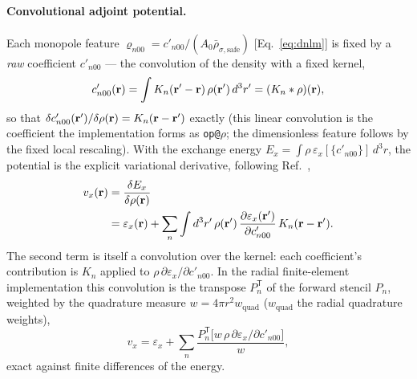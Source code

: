 \paragraph*{Convolutional adjoint potential.}
Each monopole feature $\varrho_{n00}=c'_{n00}/(A_0\bar\rho_{\sigma,\mathrm{safe}})$
[Eq.~\eqref{eq:dnlm}] is fixed by a \emph{raw} coefficient $c'_{n00}$ --- the convolution of the
density with a fixed kernel,
\begin{equation}
\label{eq:descriptor-conv}
c'_{n00}(\mathbf{r})=\int K_n(\mathbf{r}'-\mathbf{r})\,\rho(\mathbf{r}')\,d^3r'=(K_n*\rho)(\mathbf{r}),
\end{equation}
so that $\delta c'_{n00}(\mathbf{r}')/\delta\rho(\mathbf{r})=K_n(\mathbf{r}-\mathbf{r}')$ exactly (this linear convolution is the
coefficient the implementation forms as \texttt{op@}$\rho$; the dimensionless feature follows by the
fixed local rescaling). With the exchange energy $E_x=\int\rho\,\varepsilon_x[\{c'_{n00}\}]\,d^3r$,
the potential is the explicit variational derivative, following Ref.~\cite{Sahoo2024},
\begin{equation}
\label{eq:adjoint}
\begin{aligned}
v_x(\mathbf{r})&=\frac{\delta E_x}{\delta\rho(\mathbf{r})}\\
&=\varepsilon_x(\mathbf{r})+\sum_n\int d^3r'\,\rho(\mathbf{r}')\,
\frac{\partial\varepsilon_x(\mathbf{r}')}{\partial c'_{n00}}\,K_n(\mathbf{r}-\mathbf{r}') .
\end{aligned}
\end{equation}
The second term is itself a convolution over the kernel: each coefficient's
contribution is $K_n$ applied to $\rho\,\partial\varepsilon_x/\partial c'_{n00}$. In the
radial finite-element implementation this convolution is the transpose
$P_n^{\mathsf T}$ of the forward stencil $P_n$, weighted by the quadrature measure
$w=4\pi r^2 w_{\mathrm{quad}}$ ($w_{\mathrm{quad}}$ the radial quadrature weights),
\begin{equation}
\label{eq:adjoint-discrete}
v_x=\varepsilon_x+\sum_n \frac{P_n^{\mathsf T}\!\bigl[w\,\rho\,
\partial\varepsilon_x/\partial c'_{n00}\bigr]}{w} ,
\end{equation}
exact against finite differences of the energy.

